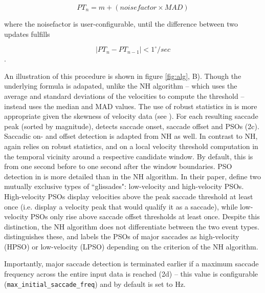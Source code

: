     $$PT_n = m + (noisefactor \times MAD)$$

    where the noisefactor is user-configurable, until the difference between two updates fulfills

    $$|PT_n - PT_{n-1}| < 1^\circ/sec$$.

    An illustration of this procedure is shown in figure \ref{fig:alg}, B). Though the underlying formula is
    adapated, unlike the NH algorithm -- which uses the average and standard deviations of the velocities to compute
    the threshold -- \remodnav instead uses the median and MAD values. The use of robust statistics in \remodnav is
    more appropriate given the skewness of velocity data (see \cite{Friedman2018}). For each resulting saccade peak
    (sorted by magnitude), \remodnav detects saccade onset, saccade offset and PSOs (2c). Saccadic on- and offset
    detection is adapted from NH as well. In contrast to NH, \remodnav again relies on robust statistics, and on a local
    velocity threshold computation in the temporal vicinity around a respective candidate window. By default, this is
    from one second before to one second after the window boundaries.
    PSO detection in \remodnav is more detailed than in the NH algorithm. In their paper, \cite{Nystrom2010AnData}
    define two mutually exclusive types of ``glissades": low-velocity and high-velocity PSOs. High-velocity PSOs
    display velocities above the peak saccade threshold at least once (i.e. display a velocity peak that would
    qualify it as a saccade), while low-velocity PSOs only rise above saccade offset thresholds at least once.
    Despite this distinction, the NH algorithm does not differentiate between the two event types. \remodnav
    distinguishes these, and labels the PSOs of major saccades as high-velocity (HPSO) or low-velocity (LPSO)
    depending on the criterion of the NH algorithm.

    Importantly, major saccade detection is terminated earlier if a maximum saccade frequency across the entire input
    data is reached (2d) -- this value is configurable (\texttt{max\_initial\_saccade\_freq}) and by default is set to
    \unit[2]{Hz}.

